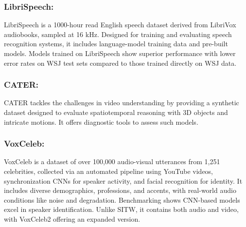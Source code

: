 \documentclass[runningheads]{llncs}
\begin{document}
\subsubsection{LibriSpeech:}
LibriSpeech \cite{ref78} is a 1000-hour read English speech dataset derived from LibriVox audiobooks, sampled at 16 kHz. Designed for training and evaluating speech recognition systems, it includes language-model training data and pre-built models. Models trained on LibriSpeech show superior performance with lower error rates on WSJ test sets compared to those trained directly on WSJ data.

\subsubsection{CATER:}
CATER \cite{ref98} tackles the challenges in video understanding by providing a synthetic dataset designed to evaluate spatiotemporal reasoning with 3D objects and intricate motions. It offers diagnostic tools to assess such models. 

\subsubsection{VoxCeleb:}
VoxCeleb \cite{ref79} is a dataset of over 100,000 audio-visual utterances from 1,251 celebrities, collected via an automated pipeline using YouTube videos, synchronization CNNs for speaker activity, and facial recognition for identity. It includes diverse demographics, professions, and accents, with real-world audio conditions like noise and degradation. Benchmarking shows CNN-based models excel in speaker identification. Unlike SITW, it contains both audio and video, with VoxCeleb2 offering an expanded version.
\end{document}
